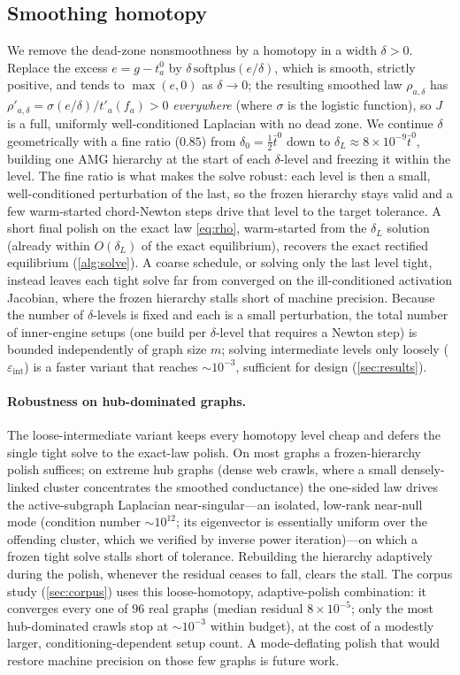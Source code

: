 \documentclass[ijoc]{informs3}
\begin{document}
\subsection{Smoothing homotopy}
We remove the dead-zone nonsmoothness by a homotopy in a width $\delta>0$. Replace the excess $e=g-t^0_a$ by
$\delta\,\mathrm{softplus}(e/\delta)$, which is smooth, strictly positive, and tends to $\max(e,0)$ as
$\delta\to0$; the resulting smoothed law $\rho_{a,\delta}$ has $\rho'_{a,\delta}=\sigma(e/\delta)/t'_a(f_a)>0$
\emph{everywhere} (where $\sigma$ is the logistic function), so $J$ is a full, uniformly well-conditioned
Laplacian with no dead zone. We continue $\delta$ geometrically with a fine ratio ($0.85$) from
$\delta_0=\tfrac12\bar t^0$ down to $\delta_L\approx8\times10^{-9}\bar t^0$, building one AMG hierarchy at the start
of each $\delta$-level and freezing it within the level. The fine ratio is what makes the solve robust: each level
is then a small, well-conditioned perturbation of the last, so the frozen hierarchy stays valid and a few
warm-started chord-Newton steps drive that level to the target tolerance. A short final polish on the exact law
\cref{eq:rho}, warm-started from the $\delta_L$ solution (already within $O(\delta_L)$ of the exact equilibrium),
recovers the exact rectified equilibrium (\cref{alg:solve}). A coarse schedule, or solving only the last level
tight, instead leaves each tight solve far from converged on the ill-conditioned activation Jacobian, where the
frozen hierarchy stalls short of machine precision. Because the number of $\delta$-levels is fixed and each is a
small perturbation, the total number of inner-engine setups (one build per $\delta$-level that requires a Newton
step) is bounded independently of graph size $m$; solving intermediate levels only loosely ($\varepsilon_{\mathrm{int}}$) is a faster variant that
reaches $\sim10^{-3}$, sufficient for design (\cref{sec:results}).

\paragraph{Robustness on hub-dominated graphs.} The loose-intermediate variant keeps every homotopy
level cheap and defers the single tight solve to the exact-law polish. On most graphs a frozen-hierarchy polish
suffices; on extreme hub graphs (dense web crawls, where a small densely-linked cluster concentrates the
smoothed conductance) the one-sided law drives the active-subgraph Laplacian near-singular---an isolated,
low-rank near-null mode (condition number ${\sim}10^{12}$; its eigenvector is essentially uniform over the
offending cluster, which we verified by inverse power iteration)---on which a frozen tight solve stalls short of
tolerance. Rebuilding the hierarchy adaptively during the polish, whenever the residual ceases to fall, clears
the stall. The corpus study (\cref{sec:corpus}) uses this loose-homotopy, adaptive-polish combination: it
converges every one of $96$ real graphs (median residual $8\times10^{-5}$; only the most hub-dominated
crawls stop at ${\sim}10^{-3}$ within budget), at the cost of a modestly larger, conditioning-dependent setup
count. A mode-deflating polish that would restore machine precision on those few graphs is future work.
\end{document}
